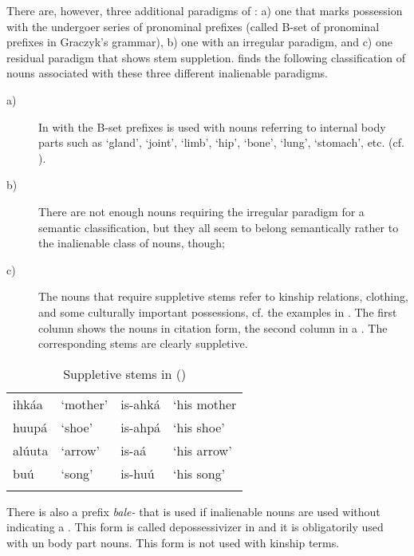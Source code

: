 \documentclass[output=paper]{LSP/langsci}
\begin{document}
There are, however, three additional paradigms of : a) one that marks possession with the undergoer series of pronominal prefixes (called B-set of pronominal prefixes in Graczyk's grammar), b) one with an irregular paradigm, and c) one residual paradigm that shows stem suppletion. \citet[57]{Graczyk2007} finds the following classification of nouns associated with these three different inalienable paradigms.

\begin{description}
\item[a)] In with the B-set prefixes is used with nouns referring to internal body parts such as `gland', `joint', `limb', `hip', `bone', `lung', `stomach', etc. (cf. \citealt[57]{Graczyk2007}).

\item[b)] There are not enough nouns requiring the irregular paradigm for a semantic classification, but they all seem to belong semantically rather to the inalienable class of nouns, though;

\item[c)] The nouns that require suppletive stems refer to kinship relations, clothing, and some culturally important possessions, cf. the examples in . The first column shows the nouns in citation form, the second column in a . The corresponding stems are clearly suppletive. 
\end{description}

\begin{table}
\caption{Suppletive stems in  (\citealt[58]{Graczyk2007})} \label{crowsuppletion}
\begin{tabular}[h]{ l l l l}
\lsptoprule
 ihkáa	 & `mother'	& is-ahká	& `his mother \\
 huupá & `shoe' &  is-ahpá	 &  `his shoe'\\
alúuta &  `arrow' & is-aá &  `his arrow'\\
buú & `song'	&  is-huú & `his song'\\
\lspbottomrule
\end{tabular}
\end{table}

There is also a prefix \textit{bale-} that is used if inalienable nouns are used without indicating a . This form is called depossessivizer in \citet[53/234]{Graczyk2007} and it is obligatorily used with un body part nouns. This form is not used with kinship terms.
\end{document}

